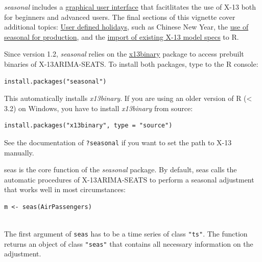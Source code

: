 \emph{seasonal} includes a \hyperref[inspect]{graphical user interface}
that facitlitates the use of X-13 both for beginners and advanced users.
The final sections of this vignette cover additional topics:
\hyperref[chinese-new-ux5cux2520year-ux5cux2520indian-diwali-in-other-customized-holidays]{User
defined holidays}, such as Chinese New Year, the
\hyperref[production-use]{use of seasonal for production}, and the
\hyperref[import-x-13-models-and-series]{import of existing X-13 model
specs} to R.


Since version 1.2, \emph{seasonal} relies on the
\href{https://cran.r-project.org/package=x13binary}{x13binary} package
to access prebuilt binaries of X-13ARIMA-SEATS. To install both
packages, type to the R console:

\begin{verbatim}
install.packages("seasonal")      
\end{verbatim}

This automatically installs \emph{x13binary}. If you are using an older
version of R (\textless{} 3.2) on Windows, you have to install
\emph{x13binary} from source:

\begin{verbatim}
install.packages("x13binary", type = "source") 
\end{verbatim}

See the documentation of \texttt{?seasonal} if you want to set the path
to X-13 manually.


seas is the core function of the \emph{seasonal} package. By default,
seas calls the automatic procedures of X-13ARIMA-SEATS to perform a
seasonal adjustment that works well in most circumstances:

\begin{verbatim}
m <- seas(AirPassengers)
 
\end{verbatim}

The first argument of \texttt{seas} has to be a time series of class
\texttt{"ts"}. The function returns an object of class \texttt{"seas"}
that contains all necessary information on the adjustment.

